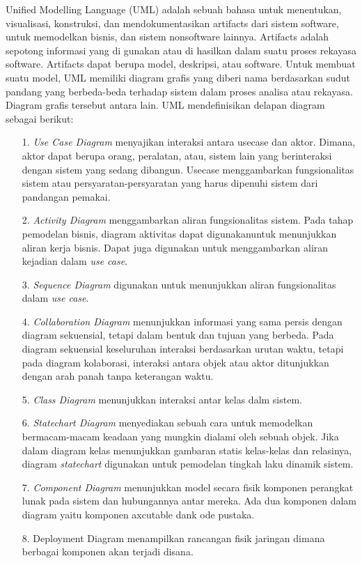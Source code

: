 \documentclass{jtetiproposalskripsi}
\begin{document}
Unified Modelling Language (UML) adalah sebuah bahasa untuk menentukan, visualisasi, konstruksi, dan mendokumentasikan artifacts dari sistem software, untuk memodelkan bisnis, dan sistem nonsoftware lainnya. Artifacts adalah sepotong informasi yang di gunakan atau di hasilkan dalam suatu proses rekayasa software. Artifacts dapat berupa model, deskripsi, atau software. Untuk membuat suatu model, UML memiliki diagram grafis yang diberi nama berdasarkan sudut pandang yang berbeda-beda terhadap sistem dalam proses analisa atau rekayasa. Diagram grafis tersebut antara lain.
UML mendefinisikan delapan diagram sebagai berikut:
\begin{itemize}
\item[1.]\textit{Use Case Diagram} menyajikan interaksi antara usecase  dan aktor. Dimana, aktor dapat berupa orang, peralatan, atau, sistem lain yang berinteraksi dengan sistem yang sedang dibangun. Usecase menggambarkan fungsionalitas sistem atau persyaratan-persyaratan yang harus dipenuhi sistem dari pandangan pemakai.
\item[2.]  \textit{Activity Diagram} menggambarkan aliran fungsionalitas sistem. Pada tahap pemodelan bisnis, diagram aktivitas dapat digunakanuntuk menunjukkan aliran kerja bisnis. Dapat juga digunakan untuk menggambarkan aliran kejadian  dalam\textit{ use case}.
\item[3.]\textit{Sequence Diagram} digunakan untuk menunjukkan aliran fungsionalitas dalam \textit{use case}. 
\item[4.]\textit{Collaboration Diagram} menunjukkan informasi yang sama persis dengan diagram sekuensial, tetapi dalam bentuk dan tujuan yang berbeda. Pada diagram sekuensial keseluruhan interaksi berdasarkan urutan waktu, tetapi pada diagram kolaborasi, interaksi antara objek atau aktor ditunjukkan dengan arah panah tanpa keterangan waktu.
\item[5.]\textit{Class Diagram} menunjukkan interaksi antar kelas dalm sistem.
\item[6.]\textit{Statechart Diagram} menyediakan sebuah cara untuk memodelkan bermacam-macam keadaan yang mungkin dialami oleh sebuah objek. Jika dalam diagram kelas menunjukkan gambaran statis kelas-kelas dan relasinya, diagram \textit{statechart} digunakan untuk pemodelan tingkah laku dinamik sistem.
\item[7.]\textit{Component Diagram} menunjukkan model secara fisik komponen perangkat lunak pada sistem dan hubungannya antar mereka. Ada dua komponen dalam diagram yaitu komponen axcutable dank ode pustaka.
\item[8.]Deployment Diagram menampilkan rancangan fisik jaringan dimana berbagai komponen akan terjadi disana.
\end{itemize}
\end{document}
